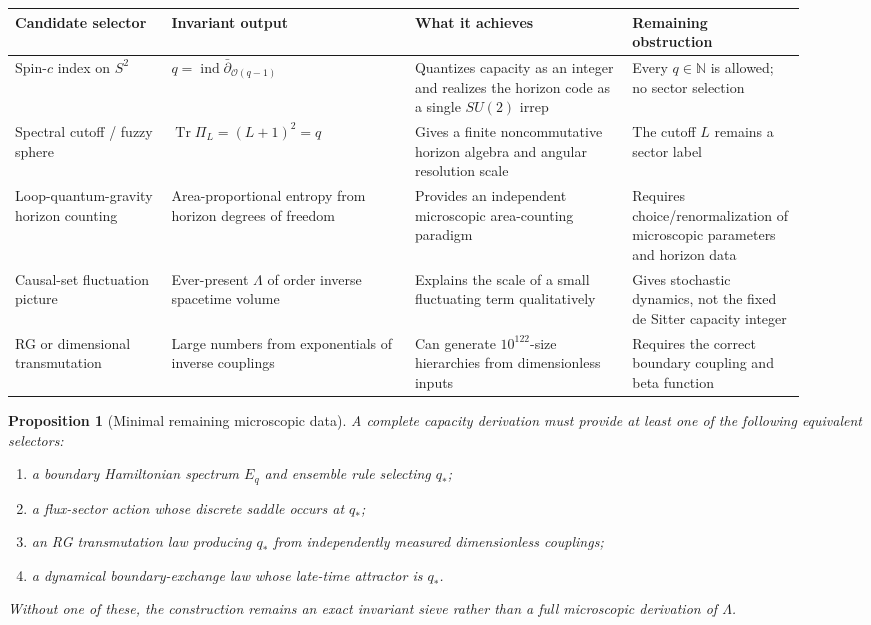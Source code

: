 \documentclass[aps,prd,reprint,nofootinbib,superscriptaddress,floatfix]{revtex4-2}
\numberwithin{equation}{section}
\theoremstyle{definition}
\theoremstyle{plain}
\newtheorem{proposition}{Proposition}[section]
\begin{document}
\begin{widetext}
\begin{center}
\footnotesize
\renewcommand{\arraystretch}{0.92}
\begin{tabular}{@{}p{0.18\linewidth}p{0.29\linewidth}p{0.25\linewidth}p{0.20\linewidth}@{}}
\toprule
Candidate selector & Invariant output & What it achieves & Remaining obstruction\\
\midrule
Spin-\(c\) index on \(S^2\) &
\(q=\operatorname{ind}\bar\partial_{\mathcal O(q-1)}\) &
Quantizes capacity as an integer and realizes the horizon code as a single \(SU(2)\) irrep &
Every \(q\in\mathbb N\) is allowed; no sector selection\\
Spectral cutoff / fuzzy sphere &
\(\operatorname{Tr}\Pi_L=(L+1)^2=q\) &
Gives a finite noncommutative horizon algebra and angular resolution scale &
The cutoff \(L\) remains a sector label\\
Loop-quantum-gravity horizon counting &
Area-proportional entropy from horizon degrees of freedom &
Provides an independent microscopic area-counting paradigm &
Requires choice/renormalization of microscopic parameters and horizon data\\
Causal-set fluctuation picture &
Ever-present \(\Lambda\) of order inverse spacetime volume &
Explains the scale of a small fluctuating term qualitatively &
Gives stochastic dynamics, not the fixed de Sitter capacity integer\\
RG or dimensional transmutation &
Large numbers from exponentials of inverse couplings &
Can generate \(10^{122}\)-size hierarchies from dimensionless inputs &
Requires the correct boundary coupling and beta function\\
\bottomrule
\end{tabular}
\end{center}
\end{widetext}

\begin{proposition}[Minimal remaining microscopic data]
A complete capacity derivation must provide at least one of the following equivalent selectors:
\begin{enumerate}
\item a boundary Hamiltonian spectrum \(E_q\) and ensemble rule selecting \(q_*\);
\item a flux-sector action whose discrete saddle occurs at \(q_*\);
\item an RG transmutation law producing \(q_*\) from independently measured dimensionless couplings;
\item a dynamical boundary-exchange law whose late-time attractor is \(q_*\).
\end{enumerate}
Without one of these, the construction remains an exact invariant sieve rather than a full microscopic derivation of \(\Lambda\).
\end{proposition}
\end{document}

